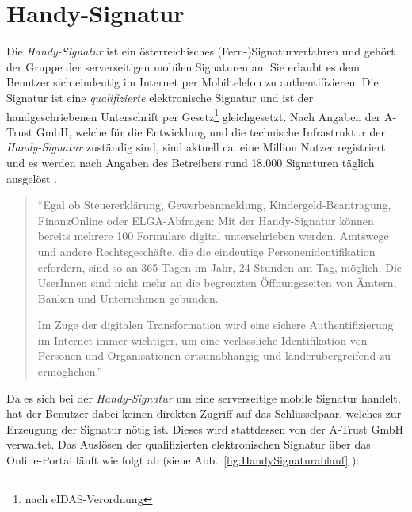 \documentclass[11pt,a4paper,ngerman]{scrreprt}
\begin{document}
\section{Handy-Signatur}\label{sec:HandySignatur}
Die \textit{Handy-Signatur} ist ein österreichisches (Fern-)Signaturverfahren und gehört der Gruppe der serverseitigen mobilen Signaturen an. Sie erlaubt es dem Benutzer sich eindeutig im Internet per Mobiltelefon zu authentifizieren. Die Signatur ist eine \emph{qualifizierte} elektronische Signatur und ist der handgeschriebenen Unterschrift per Gesetz\footnote{nach eIDAS-Verordnung} gleichgesetzt. Nach Angaben der A-Trust GmbH, welche für die Entwicklung und die technische Infrastruktur der \textit{Handy-Signatur} zuständig sind, sind aktuell ca. eine Million Nutzer registriert und es werden nach Angaben des Betreibers rund 18.000 Signaturen täglich ausgelöst \cite{atrustHSig}.
\begin{quote}
    ``Egal ob Steuererklärung, Gewerbeanmeldung, Kindergeld-Beantragung, FinanzOnline oder ELGA-Abfragen: Mit der Handy-Signatur können bereits mehrere 100 Formulare digital unterschrieben werden. Amtswege und andere Rechtsgeschäfte, die die eindeutige Personenidentifikation erfordern, sind so an 365 Tagen im Jahr, 24 Stunden am Tag, möglich. Die UserInnen sind nicht mehr an die begrenzten Öffnungszeiten von Ämtern, Banken und Unternehmen gebunden.

    Im Zuge der digitalen Transformation wird eine sichere Authentifizierung im Internet immer wichtiger, um eine verlässliche Identifikation von Personen und Organisationen ortsunabhängig und länderübergreifend zu ermöglichen.'' \cite{atrustHSig}
\end{quote}
Da es sich bei der \textit{Handy-Signatur} um eine serverseitige mobile Signatur handelt, hat der Benutzer dabei keinen direkten Zugriff auf das Schlüsselpaar, welches zur Erzeugung der Signatur nötig ist. Dieses wird stattdessen von der A-Trust GmbH verwaltet. Das Auslösen der qualifizierten elektronischen Signatur über das Online-Portal läuft wie folgt ab (siehe Abb.~\ref{fig:HandySignaturablauf} \cite[S.~3]{mobQes}):
\end{document}
